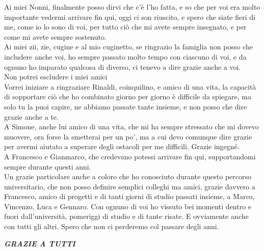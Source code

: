 \documentclass[tesi]{subfiles}
\begin{document}
Ai miei Nonni, finalmente posso dirvi che c’è l’ho fatta, e so che per voi era molto importante vedermi arrivare fin qui, oggi ci son riuscito, e spero che siate fieri di me, come io lo sono di voi, per tutto ciò che mi avete sempre insegnato, e per come mi avete sempre sostenuto.\\


Ai miei zii, zie, cugine e al mio cuginetto, se ringrazio la famiglia non posso che includere anche voi, ho sempre passato molto tempo con ciascuno di voi, e da ognuno ho imparato qualcosa di diverso, ci tenevo a dire grazie anche a voi. \\


Non potrei escludere i miei amici\\


Vorrei iniziare a ringraziare Rinaldi, coinquilino, e amico di una vita, la capacità di sopportare ciò che ho combinato giorno per giorno è difficile da spiegare, ma solo tu la puoi capire, ne abbiamo passate tante insieme, e non posso che dire grazie anche a te.\\


A Simone, anche lui amico di una vita, che mi ha sempre stressato che mi dovevo muovere, ora forse la smetterai per un po’, ma a cui devo comunque dire grazie per avermi aiutato a superare degli ostacoli per me difficili. Grazie ingegné.\\


A Francesco e Gianmarco, che credevano potessi arrivare fin qui, supportandomi sempre durante questi anni.\\


Un grazie particolare anche a coloro che ho conosciuto durante questo percorso universitario, che non posso definire semplici colleghi ma amici, grazie davvero a Francesco, amico di progetti e di tanti giorni di studio passati insieme, a Marco, Vincenzo, Luca e Gennaro. Con ognuno di voi ho vissuto bei momenti dentro e fuori dall’università, pomeriggi di studio e di tante risate. E ovviamente anche con tutti gli altri. Spero che non ci perderemo col passare degli anni.\\

\begin{center}
\begin{large}
\textbf{
\textit{GRAZIE A TUTTI}}
\end{large}
\end{center}
\end{document}
